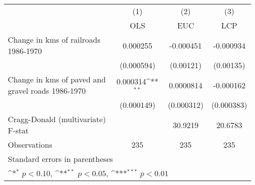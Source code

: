 {
\def\sym#1{\ifmmode^{#1}\else\(^{#1}\)\fi}
\begin{tabular}{l*{3}{c}}
\hline\hline
                &\multicolumn{1}{c}{(1)}&\multicolumn{1}{c}{(2)}&\multicolumn{1}{c}{(3)}\\
                &\multicolumn{1}{c}{OLS}&\multicolumn{1}{c}{EUC}&\multicolumn{1}{c}{LCP}\\
\hline
Change in kms of railroads 1986-1970& 0.000255         &-0.000451         &-0.000934         \\
                &(0.000594)         &(0.00121)         &(0.00135)         \\
[1em]
Change in kms of paved and gravel roads 1986-1970& 0.000314\sym{**} &0.0000814         &-0.000162         \\
                &(0.000149)         &(0.000312)         &(0.000383)         \\
\hline
Cragg-Donald (multivariate) F-stat&                  &  30.9219         &  20.6783         \\
Observations    &      235         &      235         &      235         \\
\hline\hline
\multicolumn{4}{l}{\footnotesize Standard errors in parentheses}\\
\multicolumn{4}{l}{\footnotesize \sym{*} \(p<0.10\), \sym{**} \(p<0.05\), \sym{***} \(p<0.01\)}\\
\end{tabular}
}
